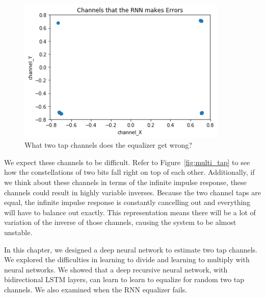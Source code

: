 \begin{figure}
\begin{center}
\includegraphics[width=100mm]{figures/equal/incorrect_channels.png}
\caption{What two tap channels does the equalizer get wrong?}
\label{fig:incorr_chan}
\end{center}
\end{figure}

We expect these channels to be difficult.  Refer to Figure~\ref{fig:multi_tap} to see how the constellations of two bits fall right on top of each other.
Additionally, if we think about these channels in terms of the infinite impulse response, these channels could result in highly variable inverses.  Because the two channel taps are equal, the infinite impulse response is constantly cancelling out and everything will have to balance out exactly.  This representation means there will be a lot of variation of the inverse of those channels, causing the system to be almost unstable.

In this chapter, we designed a deep neural network to estimate two tap channels.
We explored the difficulties in learning to divide and learning to multiply with neural networks. We showed that a deep recursive neural network, with bidirectional LSTM layers, can learn to learn to equalize for random two tap channels.  We also examined when the RNN equalizer fails. 